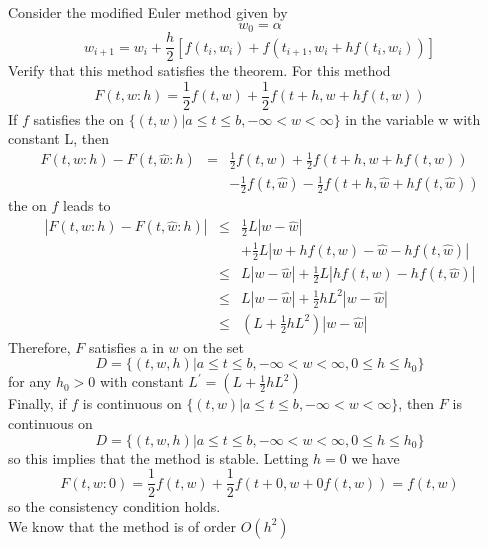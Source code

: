\begin{example}
Consider the modified Euler method given by
\[w_0=\alpha \]
\[w_{i+1}=w_{i}+\frac{h}{2}[f(t_{i},w_{i})+f(t_{i+1},w_i+hf(t_{i},w_{i}))] \]
Verify that this method satisfies the theorem. For this method
\[F(t,w:h) = \frac{1}{2}f(t,w)+\frac{1}{2}f(t+h,w+hf(t,w)) \]
If $f$ satisfies the  on $\{(t,w)|a\leq t \leq b, -\infty < w < \infty \}$ in the variable w with constant L, then
\begin{eqnarray*}
F(t,w:h)-F(t,\hat{w}:h)&=&\frac{1}{2}f(t,w)+\frac{1}{2}f(t+h,w+hf(t,w))\\
& & -\frac{1}{2}f(t,\hat{w})-\frac{1}{2}f(t+h,\hat{w}+hf(t,\hat{w}))
\end{eqnarray*}
the  on $f$ leads to
\begin{eqnarray*}
|F(t,w:h)-F(t,\hat{w}:h)|&\leq&\frac{1}{2}L|w-\hat{w}|\\
& & +\frac{1}{2}L|w+hf(t,w)-\hat{w}-hf(t,\hat{w})|\\
&\leq&L|w-\hat{w}|+\frac{1}{2}L|hf(t,w)-hf(t,\hat{w})|\\
&\leq&L|w-\hat{w}|+\frac{1}{2}hL^2|w-\hat{w}|\\
&\leq&\left(L+\frac{1}{2}hL^2\right)|w-\hat{w}|
\end{eqnarray*}
Therefore, $F$ satisfies a  in $w$ on the set
\[
D=\{(t,w,h)|a\leq t \leq b, -\infty < w < \infty, 0\leq h \leq h_0\}
\]
for any $h_0>0$ with constant $L^{'}=\left(L+\frac{1}{2}hL^2\right)$\\
Finally, if $f$ is continuous on 
$\{(t,w)|a\leq t \leq b, -\infty < w < \infty \}$, then $F$ is continuous on
\[
D=\{(t,w,h)|a\leq t \leq b, -\infty < w < \infty, 0\leq h \leq h_0\}
\]
so this implies that the method is stable. Letting $h=0$ we have
\[F(t,w:0) = \frac{1}{2}f(t,w)+\frac{1}{2}f(t+0,w+0f(t,w))=f(t,w) \]
so the consistency condition holds.\\
We know that the method is of order $O(h^2)$
\end{example}
